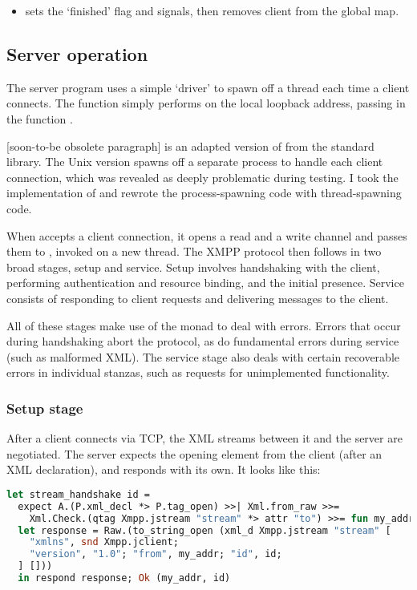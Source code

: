 \documentclass[12pt,a4paper,twoside,openright]{report}
\begin{document}
{\begin{itemize}
  \item {} sets the `finished' flag and signals, then removes client from the global map.
\end{itemize}

\subsection{Server operation}
The server program uses a simple `driver' to spawn off a thread each time a client connects. The function  simply performs  on the local loopback address, passing in the function .

[soon-to-be obsolete paragraph]
 is an adapted version of  from the standard library. The Unix version spawns off a separate process to handle each client connection, which was revealed as deeply problematic during testing. I took the implementation of  and rewrote the process-spawning code with thread-spawning code.

When  accepts a client connection, it opens a read and a write channel and passes them to , invoked on a new thread. The XMPP protocol then follows in two broad stages, setup and service. Setup involves handshaking with the client, performing authentication and resource binding, and the initial presence. Service consists of responding to client requests and delivering messages to the client.

All of these stages make use of the  monad to deal with errors. Errors that occur during handshaking abort the protocol, as do fundamental errors during service (such as malformed XML). The service stage also deals with certain recoverable errors in individual stanzas, such as requests for unimplemented functionality.

\subsubsection{Setup stage}
After a client connects via TCP, the XML streams between it and the server are negotiated. The server expects the  opening element from the client (after an XML declaration), and responds with its own. It looks like this:

\begin{lstlisting}[language=ml]
let stream_handshake id =
  expect A.(P.xml_decl *> P.tag_open) >>| Xml.from_raw >>=
    Xml.Check.(qtag Xmpp.jstream "stream" *> attr "to") >>= fun my_addr ->
  let response = Raw.(to_string_open (xml_d Xmpp.jstream "stream" [
    "xmlns", snd Xmpp.jclient;
    "version", "1.0"; "from", my_addr; "id", id;
  ] []))
  in respond response; Ok (my_addr, id)
\end{lstlisting}

}
\end{document}
